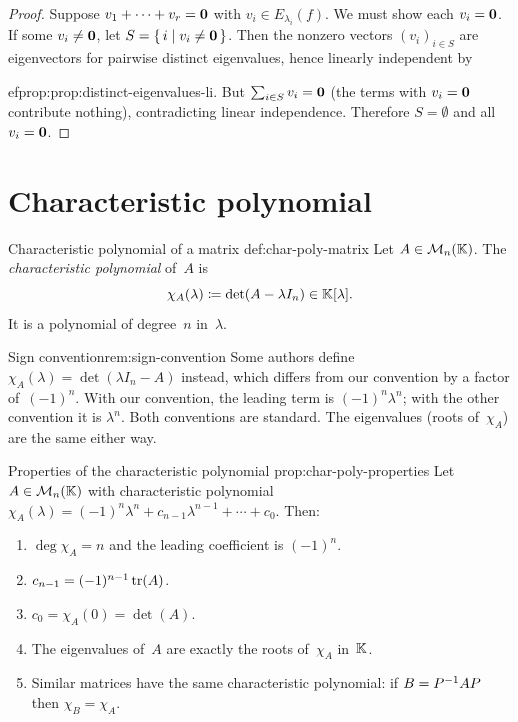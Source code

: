 \begin{proof}
Suppose $v_1 + \cdots + v_r = \mathbf{0}$ with $v_i\in E_{\lambda_i}(f)$.
We must show each $v_i = \mathbf{0}$.  If some $v_i \neq \mathbf{0}$, let
$S = \left\{\,i\;\middle|\;v_i \neq \mathbf{0}\,\right\}$.  Then the nonzero vectors
$(v_i)_{i\in S}$ are eigenvectors for pairwise distinct eigenvalues,
hence linearly independent by

ef{prop:prop:distinct-eigenvalues-li}.  But
$\sum_{i\in S} v_i = \mathbf{0}$ (the terms with $v_i = \mathbf{0}$ contribute
nothing), contradicting linear independence.  Therefore $S = \emptyset$
and all $v_i = \mathbf{0}$.
\end{proof}


\section{Characteristic polynomial}\label{sec:char-poly}

\begin{definition}{Characteristic polynomial of a matrix}%
{def:char-poly-matrix}
Let $A\in\mathcal{M}_n({\mathbb{K}})$.  The \emph{characteristic polynomial} of~$A$ is
\[
  \chi_A(\lambda) \coloneqq \det(A - \lambda I_n) \in {\mathbb{K}}[\lambda].
\]
It is a polynomial of degree~$n$ in~$\lambda$.
\end{definition}

\begin{remark}{Sign convention}{rem:sign-convention}
Some authors define $\chi_A(\lambda) = \det(\lambda I_n - A)$
instead, which differs from our convention by a factor of~$(-1)^n$.
With our convention, the leading term is $(-1)^n\lambda^n$; with the
other convention it is $\lambda^n$.  Both conventions are standard.
The eigenvalues (roots of~$\chi_A$) are the same either way.
\end{remark}

\begin{proposition}{Properties of the characteristic polynomial}%
{prop:char-poly-properties}
Let $A\in\mathcal{M}_n({\mathbb{K}})$ with characteristic polynomial
$\chi_A(\lambda) = (-1)^n\lambda^n + c_{n-1}\lambda^{n-1} + \cdots + c_0$.
Then:
\begin{enumerate}[label=(\roman*)]
  \item $\deg\chi_A = n$ and the leading coefficient is $(-1)^n$.
  \item $c_{n-1} = (-1)^{n-1}\operatorname{tr}(A)$.
  \item $c_0 = \chi_A(0) = \det(A)$.
  \item The eigenvalues of~$A$ are exactly the roots of~$\chi_A$
    in~${\mathbb{K}}$.
  \item Similar matrices have the same characteristic polynomial:
    if $B = {P}^{-1}AP$ then $\chi_B = \chi_A$.
\end{enumerate}
\end{proposition}

